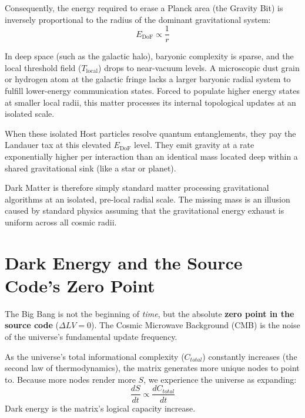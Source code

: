 \documentclass[12pt,a4paper]{article}
\begin{document}
Consequently, the energy required to erase a Planck area (the Gravity Bit) is inversely proportional to the radius of the dominant gravitational system:
\begin{equation}
E_{\mathrm{DoF}} \propto \frac{1}{r}
\end{equation}

In deep space (such as the galactic halo), baryonic complexity is sparse, and the local threshold field ($T_{\mathrm{local}}$) drops to near-vacuum levels. A microscopic dust grain or hydrogen atom at the galactic fringe lacks a larger baryonic radial system to fulfill lower-energy communication states. Forced to populate higher energy states at smaller local radii, this matter processes its internal topological updates at an isolated scale.

When these isolated Host particles resolve quantum entanglements, they pay the Landauer tax at this elevated $E_{\mathrm{DoF}}$ level. They emit gravity at a rate exponentially higher per interaction than an identical mass located deep within a shared gravitational sink (like a star or planet). 

Dark Matter is therefore simply standard matter processing gravitational algorithms at an isolated, pre-local radial scale. The missing mass is an illusion caused by standard physics assuming that the gravitational energy exhaust is uniform across all cosmic radii.



\section{Dark Energy and the Source Code's Zero Point}

The Big Bang is not the beginning of \textit{time}, but the absolute \textbf{zero point in the source code} ($\Delta LV = 0$). The Cosmic Microwave Background (CMB) is the noise of the universe's fundamental update frequency.

As the universe's total informational complexity ($C_{total}$) constantly increases (the second law of thermodynamics), the matrix generates more unique nodes to point to. Because more nodes render more $S$, we experience the universe as expanding:
\begin{equation}
\frac{dS}{dt} \propto \frac{dC_{total}}{dt}
\end{equation}
Dark energy is the matrix's logical capacity increase.
\end{document}
